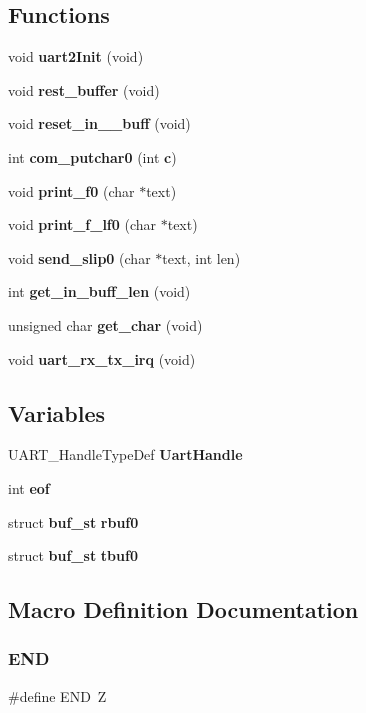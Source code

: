 \subsection*{Functions}
\begin{DoxyCompactItemize}
\item 
void \textbf{ uart2\+Init} (void)
\item 
void \textbf{ rest\+\_\+buffer} (void)
\item 
void \textbf{ reset\+\_\+in\+\_\+\_\+buff} (void)
\item 
int \textbf{ com\+\_\+putchar0} (int \textbf{ c})
\item 
void \textbf{ print\+\_\+f0} (char $\ast$text)
\item 
void \textbf{ print\+\_\+f\+\_\+lf0} (char $\ast$text)
\item 
void \textbf{ send\+\_\+slip0} (char $\ast$text, int len)
\item 
int \textbf{ get\+\_\+in\+\_\+buff\+\_\+len} (void)
\item 
unsigned char \textbf{ get\+\_\+char} (void)
\item 
void \textbf{ uart\+\_\+rx\+\_\+tx\+\_\+irq} (void)
\end{DoxyCompactItemize}
\subsection*{Variables}
\begin{DoxyCompactItemize}
\item 
U\+A\+R\+T\+\_\+\+Handle\+Type\+Def \textbf{ Uart\+Handle}
\item 
int \textbf{ eof}
\item 
struct \textbf{ buf\+\_\+st} \textbf{ rbuf0}
\item 
struct \textbf{ buf\+\_\+st} \textbf{ tbuf0}
\end{DoxyCompactItemize}


\subsection{Macro Definition Documentation}
\mbox{\label{_uart2_8c_a29fd18bed01c4d836c7ebfe73a125c3f}} 
\subsubsection{E\+ND}
{\footnotesize\ttfamily \#define E\+ND~\textquotesingle{}Z\textquotesingle{}}



